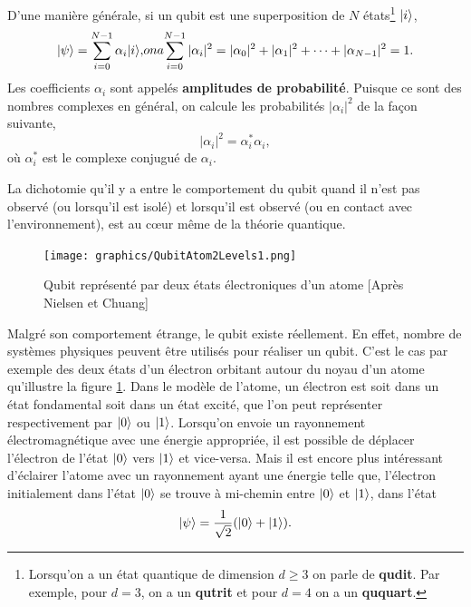 D'une manière générale, si un qubit est une superposition de $N$
états\footnote{Lorsqu'on a un état quantique de dimension $d\geq 3$ on parle de
\textbf{qudit}. Par exemple, pour $d=3$, on a un \textbf{qutrit} et  pour $d=4$
on a un \textbf{ququart}.} $\vert i\rangle$,
\begin{subequations}
 \begin{align}
\ket{\psi}=\sum_{i=0}^{N-1}\alpha_{i}\ket{i},
\end{align}
on a
\begin{align}
 \sum_{i=0}^{N-1}|\alpha_{i}|^{2}=|\alpha_{0}|^{2}+|\alpha_1|^{2}
+\cdots+|\alpha_{N-1}|^{2}=1.
\end{align}
\end{subequations}
Les coefficients $\alpha_{i}$ sont appelés \textbf{amplitudes de probabilité}.
Puisque ce sont des nombres complexes en général, on calcule les probabilités
$|\alpha_{i}|^{2}$ de la façon suivante,
\begin{equation}
 |\alpha_{i}|^{2}=\alpha_{i}^{*}\alpha_{i},
\end{equation}
où $\alpha_{i}^{*}$ est le complexe conjugué de $\alpha_{i}$.

La dichotomie qu'il y a entre le comportement du qubit quand il n'est pas
observé (ou lorsqu'il est isolé) et lorsqu'il est observé (ou en contact
avec l'environnement), est au cœur même de la théorie quantique.

\begin{figure}[ptbh]
 \centering
\texttt{[image: graphics/QubitAtom2Levels1.png]}
\caption{Qubit représenté par deux états électroniques d'un atome [Après
Nielsen et Chuang\cite{MNIC2000}]}
 \label{fig:QubitAtom2Levels}
\end{figure}

Malgré son comportement étrange, le qubit existe réellement. En effet,
nombre de systèmes physiques peuvent être utilisés pour réaliser un qubit.
C'est le cas par exemple des deux états d'un électron orbitant autour du noyau
d'un atome qu'illustre la figure \ref{fig:QubitAtom2Levels}. Dans le modèle
de l'atome, un électron est soit dans un état fondamental soit dans un état
excité, que l'on peut représenter respectivement par $\vert0\rangle$ ou $\vert1\rangle$.
Lorsqu'on envoie un rayonnement électromagnétique avec une énergie appropriée,
il est possible de déplacer l'électron de l'état $\vert0\rangle$ vers $\vert1\rangle$ et
vice-versa. Mais il est encore plus intéressant d'éclairer l'atome avec un
rayonnement ayant une énergie telle que, l'électron initialement dans l'état
$\vert0\rangle$ se trouve à mi-chemin entre $\vert0\rangle$ et $\vert1\rangle$, dans l'état
\begin{equation}
 \vert\psi\rangle=\frac{1}{\sqrt{2}}(\vert0\rangle+\vert1\rangle).
\end{equation}

